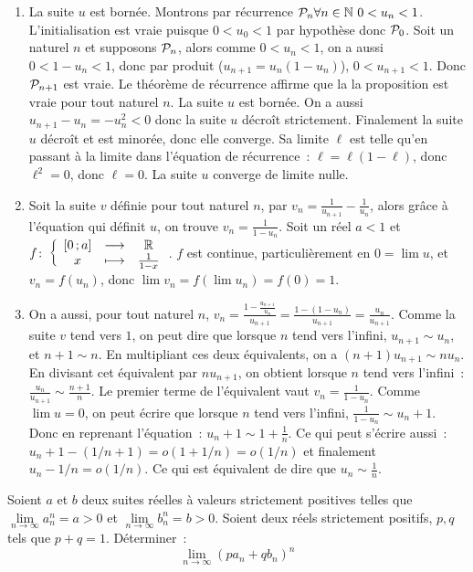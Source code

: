\begin{enumerate}
    \item La suite \(u\) est bornée. Montrons par récurrence \(\P_n \forall n \in \N \ 0<u_n<1\). L'initialisation est vraie puisque \(0<u_0<1\) par hypothèse donc \(\P_0\). Soit un naturel \(n\) et supposons \(\P_n\), alors comme \(0<u_n<1\), on a aussi \(0<1-u_n<1\), donc par produit (\(u_{n+1} = u_n(1-u_n)\)), \(0<u_{n+1}<1\). Donc \(\P_{n+1}\) est vraie. Le théorème de récurrence affirme que la la proposition est vraie pour tout naturel \(n\). La suite \(u\) est bornée. On a aussi \(u_{n+1}-u_n = -u_n^2 < 0\) donc la suite \(u\) décroît strictement. Finalement la suite \(u\) décroît et est minorée, donc elle converge. Sa limite \(\ell\) est telle qu'en passant à la limite dans l'équation de récurrence~: \(\ell = \ell(1-\ell)\), donc \(\ell^2 = 0\), donc \(\ell = 0\). La suite \(u\) converge de limite nulle.
    \item Soit la suite \(v\) définie pour tout naturel \(n\), par \(v_n =\frac{1}{u_{n+1}} - \frac{1}{u_n}\), alors grâce à l'équation qui définit \(u\), on trouve \(v_n = \frac{1}{1-u_n}\). Soit un réel \(a<1\) et \(\fonction{f}{\intervalleff{0}{a}}{\R}{x}{\frac{1}{1-x}}\). \(f\) est continue, particulièrement en \(0 = \lim u\), et \(v_n = f(u_n)\), donc \(\lim v_n = f(\lim u_n) = f(0) = 1\). 
    \item On a aussi, pour tout naturel \(n\),  \(v_n = \frac{1 - \frac{u_{n+1}}{u_n}}{u_{n+1}} = \frac{1-(1-u_n)}{u_{n+1}} = \frac{u_n}{u_{n+1}}\). Comme la suite \(v\) tend vers \(1\), on peut dire que lorsque \(n\) tend vers l'infini, \(u_{n+1} \sim u_n\), et \(n+1 \sim n\). En multipliant ces deux équivalents, on a \((n+1)u_{n+1} \sim n u_n\). En divisant cet équivalent par \(n u_{n+1}\), on obtient lorsque \(n\) tend vers l'infini~: \(\frac{u_n}{u_{n+1}} \sim \frac{n+1}{n}\). Le premier terme de l'équivalent vaut \(v_n = \frac{1}{1-u_n}\). Comme \(\lim u = 0\), on peut écrire que lorsque \(n\) tend vers l'infini, \(\frac{1}{1-u_n} \sim u_n+1\). Donc en reprenant l'équation~: \(u_n+1 \sim 1+\frac{1}{n}\). Ce qui peut s'écrire aussi~: \(u_n+1 -(1/n+1) = o(1+1/n) = o(1/n)\) et finalement \(u_n-1/n = o(1/n)\). Ce qui est équivalent de dire que \(u_n \sim \frac{1}{n}\).
\end{enumerate}
\begin{exercice}
    Soient \(a\) et \(b\) deux suites réelles à valeurs strictement positives telles que \(\lim\limits_{n\to\infty} a_n^n = a > 0\) et \(\lim\limits_{n\to\infty} b_n^n = b > 0\). Soient deux réels strictement positifs, \(p, q\) tels que \(p+q = 1\). Déterminer~:
    \[\lim\limits_{n\to\infty} (pa_n+qb_n)^n\]
\end{exercice}
